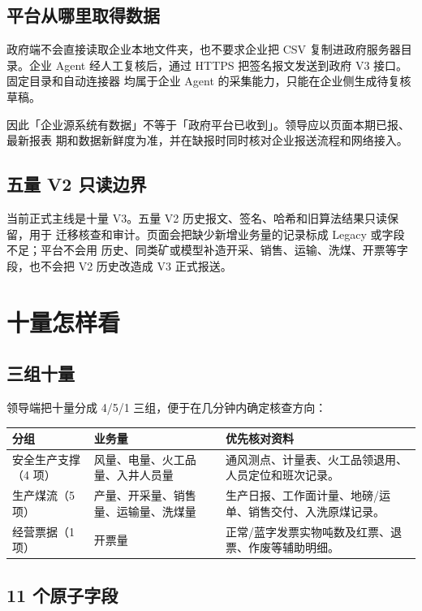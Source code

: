 \documentclass[UTF8,openany,zihao=-4,fontset=none]{ctexbook}
\begin{document}
\section{平台从哪里取得数据}

政府端不会直接读取企业本地文件夹，也不要求企业把 CSV 复制进政府服务器目录。企业
Agent 经人工复核后，通过 HTTPS 把签名报文发送到政府 V3 接口。固定目录和自动连接器
均属于企业 Agent 的采集能力，只能在企业侧生成待复核草稿。

因此「企业源系统有数据」不等于「政府平台已收到」。领导应以页面本期已报、最新报表
期和数据新鲜度为准，并在缺报时同时核对企业报送流程和网络接入。

\section{五量 V2 只读边界}

当前正式主线是十量 V3。五量 V2 历史报文、签名、哈希和旧算法结果只读保留，用于
迁移核查和审计。页面会把缺少新增业务量的记录标成 Legacy 或字段不足；平台不会用
历史、同类矿或模型补造开采、销售、运输、洗煤、开票等字段，也不会把 V2 历史改造成
V3 正式报送。

\chapter{十量怎样看}

\section{三组十量}

领导端把十量分成 4/5/1 三组，便于在几分钟内确定核查方向：

\begin{longtable}{P{34mm}P{57mm}P{53mm}}
\toprule
\textbf{分组} & \textbf{业务量} & \textbf{优先核对资料}\\
\midrule
安全生产支撑（4 项） & 风量、电量、火工品量、入井人员量 & 通风测点、计量表、火工品领退用、人员定位和班次记录。\\
生产煤流（5 项） & 产量、开采量、销售量、运输量、洗煤量 & 生产日报、工作面计量、地磅/运单、销售交付、入洗原煤记录。\\
经营票据（1 项） & 开票量 & 正常/蓝字发票实物吨数及红票、退票、作废等辅助明细。\\
\bottomrule
\end{longtable}

\section{11 个原子字段}
\end{document}
